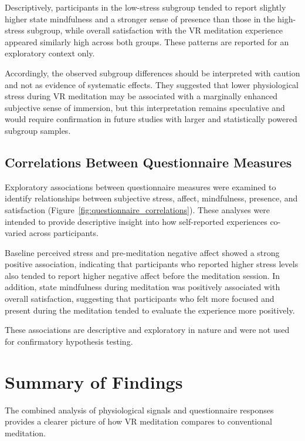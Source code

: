 Descriptively, participants in the low-stress subgroup tended to report
slightly higher state mindfulness and a stronger sense of presence than
those in the high-stress subgroup, while overall satisfaction with the
VR meditation experience appeared similarly high across both groups.
These patterns are reported for an exploratory context only.

Accordingly, the observed subgroup differences should be interpreted
with caution and not as evidence of systematic effects. They suggested
that lower physiological stress during VR meditation may be associated
with a marginally enhanced subjective sense of immersion, but this
interpretation remains speculative and would require confirmation in
future studies with larger and statistically powered subgroup samples.



\subsection{Correlations Between Questionnaire Measures}
\label{sec:questionnaire_correlations}

Exploratory associations between questionnaire measures were examined to
identify relationships between subjective stress, affect, mindfulness,
presence, and satisfaction (Figure~\ref{fig:questionnaire_correlations}).
These analyses were intended to provide descriptive insight into how
self-reported experiences co-varied across participants.

Baseline perceived stress and pre-meditation negative affect showed a
strong positive association, indicating that participants who reported
higher stress levels also tended to report higher negative affect before
the meditation session. In addition, state mindfulness during meditation
was positively associated with overall satisfaction, suggesting that
participants who felt more focused and present during the meditation
tended to evaluate the experience more positively.

These associations are descriptive and exploratory in nature and were
not used for confirmatory hypothesis testing.


\section{Summary of Findings}
\label{sec:summary}

The combined analysis of physiological signals and questionnaire responses provides a clearer picture of how VR meditation compares to conventional meditation.


